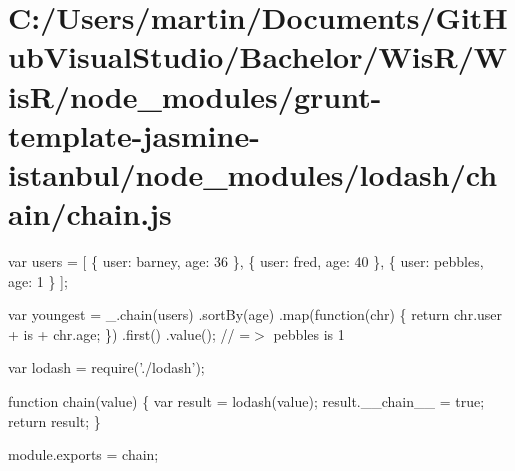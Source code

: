 \hypertarget{_c_1_2_users_2martin_2_documents_2_git_hub_visual_studio_2_bachelor_2_wis_r_2_wis_r_2node_modulec6e9fc73fee8187b5268b6f4349f5b18}{}\section{C\+:/\+Users/martin/\+Documents/\+Git\+Hub\+Visual\+Studio/\+Bachelor/\+Wis\+R/\+Wis\+R/node\+\_\+modules/grunt-\/template-\/jasmine-\/istanbul/node\+\_\+modules/lodash/chain/chain.\+js}
var users = \mbox{[} \{ \textquotesingle{}user\textquotesingle{}\+: \textquotesingle{}barney\textquotesingle{}, \textquotesingle{}age\textquotesingle{}\+: 36 \}, \{ \textquotesingle{}user\textquotesingle{}\+: \textquotesingle{}fred\textquotesingle{}, \textquotesingle{}age\textquotesingle{}\+: 40 \}, \{ \textquotesingle{}user\textquotesingle{}\+: \textquotesingle{}pebbles\textquotesingle{}, \textquotesingle{}age\textquotesingle{}\+: 1 \} \mbox{]};

var youngest = \+\_\+.\+chain(users) .sort\+By(\textquotesingle{}age\textquotesingle{}) .map(function(chr) \{ return chr.\+user + \textquotesingle{} is \textquotesingle{} + chr.\+age; \}) .first() .value(); // =$>$ \textquotesingle{}pebbles is 1\textquotesingle{}


\begin{DoxyCodeInclude}
var lodash = require(\textcolor{stringliteral}{'./lodash'});

\textcolor{keyword}{function} chain(value) \{
  var result = lodash(value);
  result.\_\_chain\_\_ = \textcolor{keyword}{true};
  \textcolor{keywordflow}{return} result;
\}

module.exports = chain;
\end{DoxyCodeInclude}
 